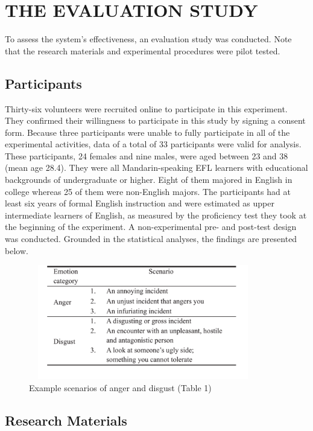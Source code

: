 \documentclass[a4paper,12pt,oneside]{article}
\let\counterwithin\relax
\begin{document}
\newpage
\section{THE EVALUATION STUDY}
To assess the system’s effectiveness, an evaluation study was conducted. Note that the research materials and experimental procedures were pilot tested. 

\subsection{Participants}

Thirty-six volunteers were recruited online to participate in this experiment. They confirmed their willingness to participate in this study by signing a consent form. Because three participants were unable to fully participate in all of the experimental activities, data of a total of 33 participants were valid for analysis. These participants, 24 females and nine males, were aged between 23 and 38 (mean age 28.4). They were all Mandarin-speaking EFL learners with educational backgrounds of undergraduate or higher. Eight of them majored in English in college whereas 25 of them were non-English majors. The participants had at least six years of formal English instruction and were estimated as upper intermediate learners of English, as measured by the proficiency test they took at the beginning of the experiment. A non-experimental pre- and post-test design was conducted. Grounded in the statistical analyses, the findings are presented below. 

\begin{figure}[H]
\includegraphics[height=5cm,width=10cm]{Table1.png}
\centering
\caption{Example scenarios of anger and disgust (Table 1)}
\end{figure}

\subsection{Research Materials}
\end{document}
